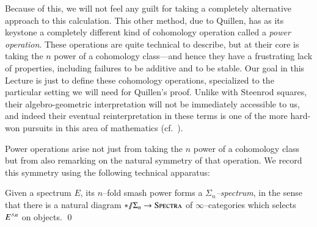 Because of this, we will not feel any guilt for taking a completely alternative approach to this calculation.  This other method, due to Quillen, has as its keystone a completely different kind of cohomology operation called a \textit{power operation}.  These operations are quite technical to describe, but at their core is taking the $n${\th} power of a cohomology class---and hence they have a frustrating lack of properties, including failures to be additive and to be stable.  Our goal in this Lecture is just to define these cohomology operations, specialized to the particular setting we will need for Quillen's proof.  Unlike with Steenrod squares, their algebro-geometric interpretation will not be immediately accessible to us, and indeed their eventual reinterpretation in these terms is one of the more hard-won pursuits in this area of mathematics (cf.\ ).

Power operations arise not just from taking the $n${\th} power of a cohomology class but from also remarking on the natural symmetry of that operation.  We record this symmetry using the following technical apparatus:
\begin{lemma}
Given a spectrum $E$, its $n$--fold smash power forms a \textit{$\Sigma_n$--spectrum}, in the sense that there is a natural diagram $* /\!\!/ \Sigma_n \to \normalfont\textsc{Spectra}$ of $\infty$--categories which selects $E^{\wedge n}$ on objects. \qed
\end{lemma}

